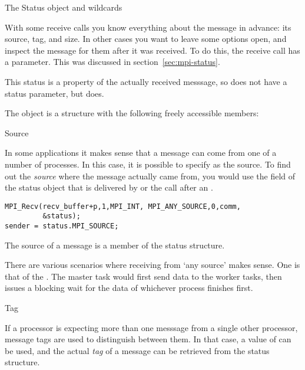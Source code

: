 

 {The Status object and wildcards}
\label{sec:mpi-wildcard}

With some receive calls you know everything about the message in advance:
its source, tag, and size. In other cases you want to leave some options
open, and inspect the message for them after it was received.
To do this, the receive call has a 
parameter. This was discussed in section~\ref{sec:mpi-status}.

This status is a property of the actually received messsage, so 
does not have a status parameter, but  does.

The  object
is a structure with the following
freely accessible members:

 {Source}

In some applications it makes sense that a message can come from 
one of a number of processes. In this case, it is possible to specify
 as the source.
%
To find out the \emph{source}
where the message actually
came from, you would use the  field of the status object
that is delivered by  or the  call after an .
\begin{lstlisting}
MPI_Recv(recv_buffer+p,1,MPI_INT, MPI_ANY_SOURCE,0,comm,
         &status);
sender = status.MPI_SOURCE;
\end{lstlisting}

The source of a message is a member of the status structure.


There are various scenarios where receiving from `any source' makes sense.
One is that of the . The master task would first send
data to the worker tasks, then issues a blocking wait for the data of whichever process
finishes first.

 {Tag}

If a processor is expecting more than one messsage from a single other processor,
message tags are used to distinguish between them. In that case,
a value of  can be used, and the actual
\emph{tag}
of a message can be retrieved from the status structure.

